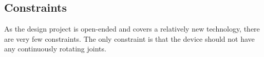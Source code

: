 \subsection{Constraints}

As the design project is open-ended and covers a relatively new technology, there are very few constraints. The only constraint is that the device should not have any continuously rotating joints. 